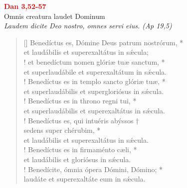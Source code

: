 


\def\greinitialformat#1{%
{\fontsize{39}{39}\selectfont #1}%
}




\vspace{0.3cm}
\begin{center}
 \textcolor{red}{\large \bf Dan 3,52-57}\\
Omnis creatura laudet Dominum\\
\textit{\small Laudem dicite Deo nostro, omnes servi eius. (Ap 19,5)}
\end{center}
\begin{verse}[\versewidth]
Benedíctus es, Dómine Deus patrum nostrórum, *\\
et laudábilis et superexaltátus in s\'{æ}cula;\\!
\vin et benedíctum nomen glóriæ tuæ sanctum, *\\
\vin et superlaudábile et superexaltátum in s\'{æ}cula.\\!
Benedíctus es in templo sancto glóriæ tuæ, *\\
et superlaudábilis et supergloriósus in s\'{æ}cula.\\!
\vin Benedíctus es in throno regni tui, *\\
\vin et superlaudábilis et superexaltátus in s\'{æ}cula.\\!
Benedíctus es, qui intuéris abýssos †\\
sedens super chérubim, *\\
et laudábilis et superexaltátus in s\'{æ}cula.\\!
\vin Benedíctus es in firmaménto cæli, *\\
\vin et laudábilis et gloriósus in s\'{æ}cula.\\!
Benedícite, ómnia ópera Dómini, Dómino; *\\
laudáte et superexaltáte eum in s\'{æ}cula.\\
\end{verse}
\vspace{1cm}


